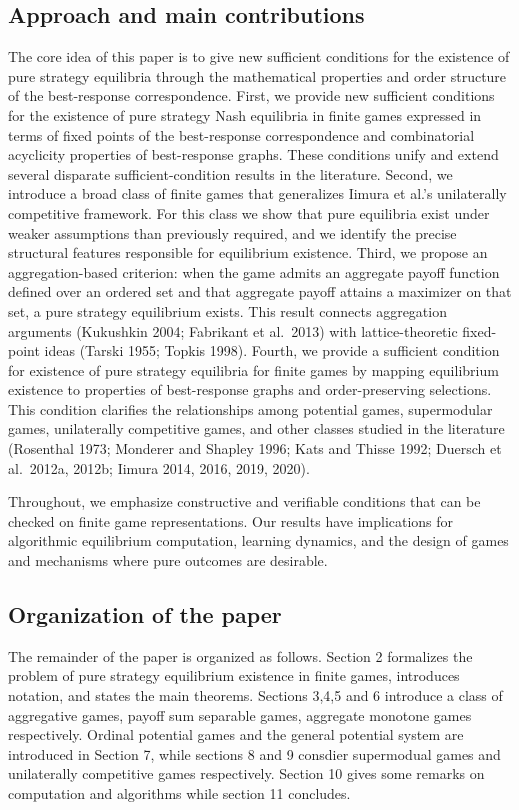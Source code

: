 \documentclass[11pt]{article}
\begin{document}
\subsection{Approach and main contributions}
The core idea of this paper is to give new sufficient conditions for the existence of pure strategy equilibria through the mathematical properties and order structure of the best-response correspondence. First, we provide new sufficient conditions for the existence of pure strategy Nash equilibria in finite games expressed in terms of fixed points of the best-response correspondence and combinatorial acyclicity properties of best-response graphs. These conditions unify and extend several disparate sufficient-condition results in the literature.
Second, we introduce a broad class of finite games that generalizes Iimura et al.'s  unilaterally competitive framework. For this class we show that pure equilibria exist under weaker assumptions than previously required, and we identify the precise structural features responsible for equilibrium existence.
Third, we propose an aggregation-based criterion: when the game admits an aggregate payoff function defined over an ordered set and that aggregate payoff attains a maximizer on that set, a pure strategy equilibrium exists. This result connects aggregation arguments (Kukushkin 2004; Fabrikant et al.\ 2013) with lattice-theoretic fixed-point ideas (Tarski 1955; Topkis 1998).
Fourth, we provide a sufficient condition for existence of pure strategy equilibria for finite games by mapping equilibrium existence to properties of best-response graphs and order-preserving selections. This condition clarifies the relationships among potential games, supermodular games, unilaterally competitive games, and other classes studied in the literature (Rosenthal 1973; Monderer and Shapley 1996; Kats and Thisse 1992; Duersch et al.\ 2012a, 2012b; Iimura 2014, 2016, 2019, 2020).


Throughout, we emphasize constructive and verifiable conditions that can be checked on finite game representations. Our results have implications for algorithmic equilibrium computation, learning dynamics, and the design of games and mechanisms where pure outcomes are desirable.

\subsection{Organization of the paper}
The remainder of the paper is organized as follows. Section 2 formalizes the problem of pure strategy equilibrium existence in finite games, introduces notation, and states the main theorems. Sections 3,4,5 and 6 introduce a class of aggregative games, payoff sum separable games, aggregate monotone games respectively. Ordinal potential games and the general potential system are introduced in Section 7, while sections 8 and 9 consdier supermodual games and unilaterally competitive games respectively. Section 10 gives some remarks on computation and algorithms while section 11 concludes. 
\end{document}
